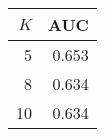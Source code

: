\begin{tabular}{rr}
\toprule
 $K$ &   AUC \\
\midrule
   5 & 0.653 \\
   8 & 0.634 \\
  10 & 0.634 \\
\bottomrule
\end{tabular}

